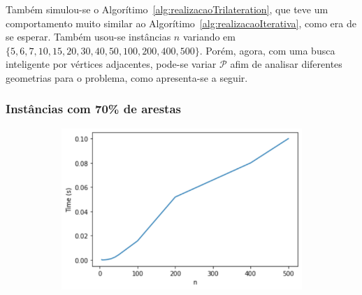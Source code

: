 \documentclass[a4paper,12pt]{report}
\begin{document}
	Também simulou-se o Algorítimo~\ref{alg:realizacaoTrilateration}, que teve um comportamento muito similar ao Algorítimo~\ref{alg:realizacaoIterativa}, como era de se esperar. Também usou-se instâncias $n$ variando em $\{5, 6, 7,10,15,20,30,40,50,100,200,400,500\}$. Porém, agora, com uma busca inteligente por vértices adjacentes, pode-se variar $\mathcal{P}$ afim de analisar diferentes geometrias para o problema, como apresenta-se a seguir.
	
	\subsubsection*{Instâncias com 70\% de arestas}
	
	\begin{figure}[H]
		\begin{center}
			\begin{minipage}{0.45 \linewidth}
				\begin{figure}[H]
					\begin{center}
						\includegraphics[width=1\linewidth]{figures/timeTriPro1.png}
					\end{center}
				\end{figure}
			\end{minipage}
			\hspace{0.1cm}
			\begin{minipage}{0.45 \linewidth}
				

\end{minipage}
\end{center}
\end{figure}
\end{document}
